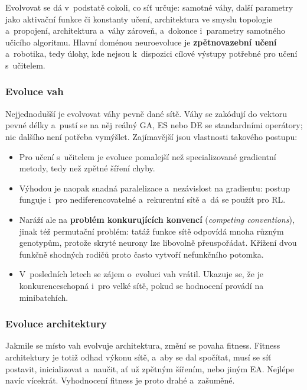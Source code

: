 \documentclass[11pt,a4paper]{article}
\theoremstyle{definition}
\begin{document}
Evolvovat se dá v~podstatě cokoli, co síť určuje: samotné váhy, další parametry jako
aktivační funkce či konstanty učení, architektura ve smyslu topologie a~propojení,
architektura a~váhy zároveň, a~dokonce i~parametry samotného učicího algoritmu. Hlavní
doménou neuroevoluce je \textbf{zpětnovazební učení} a~robotika, tedy úlohy, kde nejsou
k~dispozici cílové výstupy potřebné pro učení s~učitelem.

\subsubsection{Evoluce vah}

Nejjednodušší je evolvovat váhy pevně dané sítě. Váhy se zakódují do vektoru pevné délky
a~pustí se na něj reálný GA, ES nebo DE se standardními operátory; nic dalšího není potřeba
vymýšlet. Zajímavější jsou vlastnosti takového postupu:
\begin{itemize}
\item Pro učení s~učitelem je evoluce pomalejší než specializované gradientní metody, tedy
  než zpětné šíření chyby.
\item Výhodou je naopak snadná paralelizace a~nezávislost na gradientu: postup funguje
  i~pro nediferencovatelné a~rekurentní sítě a~dá se použít pro RL.
\item Naráží ale na \textbf{problém konkurujících konvencí}
  (\emph{competing conventions}), jinak též permutační problém: tatáž funkce sítě odpovídá
  mnoha různým genotypům, protože skryté neurony lze libovolně přeuspořádat. Křížení dvou
  funkčně shodných rodičů proto často vytvoří nefunkčního potomka.
\item V~posledních letech se zájem o~evoluci vah vrátil. Ukazuje se, že je
  konkurenceschopná i~pro velké sítě, pokud se hodnocení provádí na minibatchích.
\end{itemize}

\subsubsection{Evoluce architektury}

Jakmile se místo vah evolvuje architektura, změní se povaha fitness. Fitness architektury je
totiž odhad výkonu sítě, a~aby se dal spočítat, musí se síť postavit, inicializovat a~naučit,
ať už zpětným šířením, nebo jiným EA. Nejlépe navíc vícekrát. Vyhodnocení fitness je proto
drahé a~zašuměné.
\end{document}
